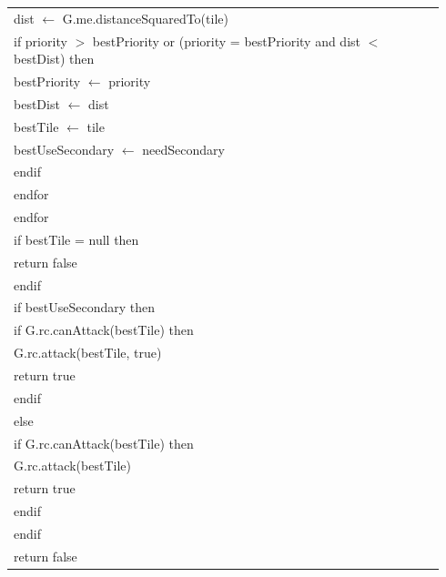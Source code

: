 \documentclass{article}
\newenvironment{pseudobox}
{
\centering
\begin{longtable}{|p{0.94\linewidth}|}
\hline
}
{
\\ \hline
\end{longtable}
\vspace{0.05cm}
}
\begin{document}
\begin{pseudobox}
\hspace*{3em} dist $\leftarrow$ G.me.distanceSquaredTo(tile) \\

\hspace*{3em} if priority $>$ bestPriority or (priority = bestPriority and dist $<$ bestDist) then \\
\hspace*{4em} bestPriority $\leftarrow$ priority \\
\hspace*{4em} bestDist $\leftarrow$ dist \\
\hspace*{4em} bestTile $\leftarrow$ tile \\
\hspace*{4em} bestUseSecondary $\leftarrow$ needSecondary \\
\hspace*{3em} endif \\
\hspace*{2em} endfor \\
\hspace*{1em} endfor \\

\hspace*{1em} if bestTile = null then \\
\hspace*{2em} return false \\
\hspace*{1em} endif \\

\hspace*{1em} if bestUseSecondary then \\
\hspace*{2em} if G.rc.canAttack(bestTile) then \\
\hspace*{3em} G.rc.attack(bestTile, true) \\
\hspace*{3em} return true \\
\hspace*{2em} endif \\
\hspace*{1em} else \\
\hspace*{2em} if G.rc.canAttack(bestTile) then \\
\hspace*{3em} G.rc.attack(bestTile) \\
\hspace*{3em} return true \\
\hspace*{2em} endif \\
\hspace*{1em} endif \\

\hspace*{1em} return false
\end{pseudobox}
\end{document}
